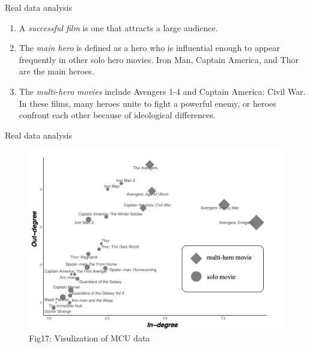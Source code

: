 \documentclass[
  ignorenonframetext,
]{beamer}
\providecommand{\tightlist}{%
  \setlength{\itemsep}{0pt}\setlength{\parskip}{0pt}}\usepackage{longtable,booktabs,array}
\begin{document}
\begin{frame}{Real data analysis}
\label{real-data-analysis-4}
\begin{enumerate}
\tightlist
\item
  A \emph{successful film} is one that attracts a large audience.
\item
  The \emph{main hero} is defined as a hero who is influential enough to
  appear frequently in other solo hero movies. Iron Man, Captain
  America, and Thor are the main heroes.
\item
  The \emph{multi-hero movies} include Avengers 1-4 and Captain America:
  Civil War. In these films, many heroes unite to fight a powerful
  enemy, or heroes confront each other because of ideological
  differences.
\end{enumerate}
\end{frame}

\begin{frame}{Real data analysis}
\label{real-data-analysis-5}
\begin{figure}[H]

{\centering \includegraphics{Beamer_files/figure-beamer/8999da2d-1900-4008-bf11-3c8d4936bf52-1-16d3a795-5a96-46a9-b379-52f4daad4ccb.png}

}

\caption{Fig17: Visulization of MCU data}

\end{figure}%
\end{frame}
\end{document}
